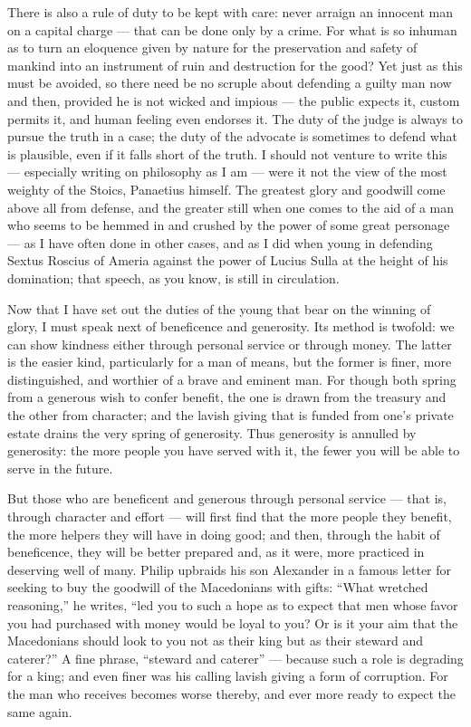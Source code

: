  There is also a rule of duty to be kept with care: never arraign an innocent man on a capital charge — that can be done only by a crime. For what is so inhuman as to turn an eloquence given by nature for the preservation and safety of mankind into an instrument of ruin and destruction for the good? Yet just as this must be avoided, so there need be no scruple about defending a guilty man now and then, provided he is not wicked and impious — the public expects it, custom permits it, and human feeling even endorses it. The duty of the judge is always to pursue the truth in a case; the duty of the advocate is sometimes to defend what is plausible, even if it falls short of the truth. I should not venture to write this — especially writing on philosophy as I am — were it not the view of the most weighty of the Stoics, Panaetius himself. The greatest glory and goodwill come above all from defense, and the greater still when one comes to the aid of a man who seems to be hemmed in and crushed by the power of some great personage — as I have often done in other cases, and as I did when young in defending Sextus Roscius of Ameria against the power of Lucius Sulla at the height of his domination; that speech, as you know, is still in circulation.

 Now that I have set out the duties of the young that bear on the winning of glory, I must speak next of beneficence and generosity. Its method is twofold: we can show kindness either through personal service or through money. The latter is the easier kind, particularly for a man of means, but the former is finer, more distinguished, and worthier of a brave and eminent man. For though both spring from a generous wish to confer benefit, the one is drawn from the treasury and the other from character; and the lavish giving that is funded from one's private estate drains the very spring of generosity. Thus generosity is annulled by generosity: the more people you have served with it, the fewer you will be able to serve in the future.

 But those who are beneficent and generous through personal service — that is, through character and effort — will first find that the more people they benefit, the more helpers they will have in doing good; and then, through the habit of beneficence, they will be better prepared and, as it were, more practiced in deserving well of many. Philip upbraids his son Alexander in a famous letter for seeking to buy the goodwill of the Macedonians with gifts: ``What wretched reasoning,'' he writes, ``led you to such a hope as to expect that men whose favor you had purchased with money would be loyal to you? Or is it your aim that the Macedonians should look to you not as their king but as their steward and caterer?'' A fine phrase, ``steward and caterer'' — because such a role is degrading for a king; and even finer was his calling lavish giving a form of corruption. For the man who receives becomes worse thereby, and ever more ready to expect the same again.

